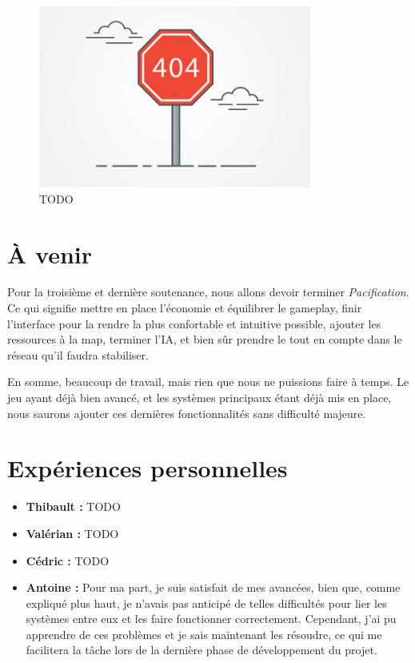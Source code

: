 \documentclass[12pt]{report}
\begin{document}
\begin{figure}[H]
    \centering
    \includegraphics[width=0.8\textwidth]{404}
    \caption{TODO}
\end{figure}

\chapter{À venir}

Pour la troisième et dernière soutenance, nous allons devoir terminer \textit{Pacification}. Ce qui signifie mettre en place l'économie et équilibrer le gameplay, finir l'interface pour la rendre la plus confortable et intuitive possible, ajouter les ressources à la map, terminer l'IA, et bien sûr prendre le tout en compte dans le réseau qu'il faudra stabiliser.

En somme, beaucoup de travail, mais rien que nous ne puissions faire à temps. Le jeu ayant déjà bien avancé, et les systèmes principaux étant déjà mis en place, nous saurons ajouter ces dernières fonctionnalités sans difficulté majeure.

\chapter{Expériences personnelles}

\begin{itemize}
	\item \textbf{Thibault :} TODO
        \item \textbf{Valérian :} TODO
	\item \textbf{Cédric :} TODO
	\item \textbf{Antoine :} Pour ma part, je suis satisfait de mes avancées, bien que, comme expliqué plus haut, je n'avais pas anticipé de telles difficultés pour lier les systèmes entre eux et les faire fonctionner correctement. Cependant, j'ai pu apprendre de ces problèmes et je sais maintenant les résoudre, ce qui me facilitera la tâche lors de la dernière phase de développement du projet.
\end{itemize}
\end{document}
